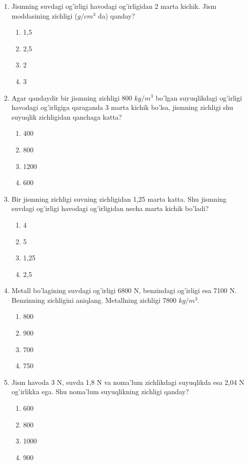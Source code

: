 \begin{enumerate}
\item Jismning suvdagi og'irligi havodagi og'irligidan 2 marta kichik. Jism moddasining zichligi ($g/cm^3$ da) qanday?
\begin{enumerate}[label=\Alph*)]
\item 1,5
\item 2,5
\item 2
\item 3
\end{enumerate}

\item Agar qandaydir bir jismning zichligi 800 $kg/m^3$ bo'lgan suyuqlikdagi og'irligi havodagi og'irligiga qaraganda 3 marta kichik bo'lsa, jismning zichligi shu suyuqlik zichligidan qanchaga katta?
\begin{enumerate}[label=\Alph*)]
\item 400
\item 800
\item 1200
\item 600
\end{enumerate}

\item Bir jismning zichligi suvning zichligidan 1,25 marta katta. Shu jismning suvdagi og'irligi havodagi og'irligidan necha marta kichik bo'ladi?
\begin{enumerate}[label=\Alph*)]
\item 4
\item 5
\item 1,25
\item 2,5
\end{enumerate}

\item Metall bo'lagining suvdagi og'irligi 6800 N, benzindagi og'irligi esa 7100 N. Benzinning zichligini aniqlang. Metallning zichligi 7800 $kg/m^3$.
\begin{enumerate}[label=\Alph*)]
\item 800
\item 900
\item 700
\item 750
\end{enumerate}

\item Jism havoda 3 N, suvda 1,8 N va noma'lum zichlikdagi suyuqlikda esa 2,04 N og'irlikka ega. Shu noma'lum suyuqlikning zichligi qanday?
\begin{enumerate}[label=\Alph*)]
\item 600
\item 800
\item 1000
\item 900
\end{enumerate}


\end{enumerate}
